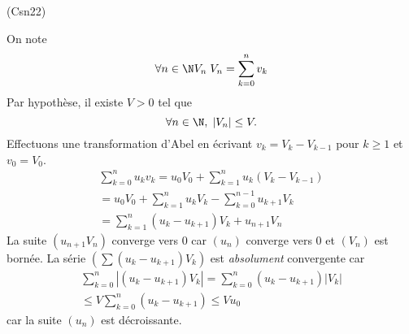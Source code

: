 \begin{tiny}(Csn22)\end{tiny} On note 
\begin{displaymath}
 \forall n\in \N V_n\; V_n = \sum_{k=0}^n v_k
\end{displaymath}
Par hypothèse, il existe $V>0$ tel que 
\begin{displaymath}
 \forall n \in \N,\; |V_n| \leq V.
\end{displaymath}
Effectuons une transformation d'Abel en écrivant $v_k = V_k - V_{k-1}$ pour $k\geq 1$ et $v_0 = V_0$.
\begin{multline*}
 \sum_{k=0}^n u_kv_k
= u_0 V_0 + \sum_{k=1}^n u_k(V_k - V_{k-1})\\
= u_0 V_0 + \sum_{k=1}^n u_kV_k - \sum_{k=0}^{n-1} u_{k+1}V_{k}\\
= \sum_{k=1}^n (u_k-u_{k+1})V_k +u_{n+1}V_n
\end{multline*}
La suite $(u_{n+1}V_n)$ converge vers $0$ car $(u_n)$ converge vers $0$ et $(V_n)$ est bornée. La série
$\left( \sum (u_k-u_{k+1})V_k\right)$ est \emph{absolument} convergente car
\begin{multline*}
 \sum_{k=0}^n \left|(u_k-u_{k+1})V_k\right| 
= \sum_{k=0}^n (u_k-u_{k+1})\left|V_k\right| \\
\leq V \sum_{k=0}^n (u_k-u_{k+1})
\leq Vu_0
\end{multline*}
car la suite $(u_n)$ est décroissante.